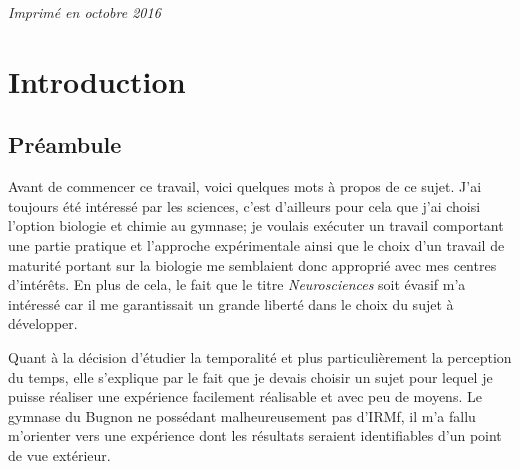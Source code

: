 \documentclass[12pt,fleqn,oneside,openany,]{book} %
\begin{document}
\noindent \textit{Imprimé en octobre 2016} %



\pagestyle{empty} %

\tableofcontents %


\pagestyle{fancy} %



\chapter{Introduction} \label{cha:introduction}
\section{Préambule}
Avant de commencer ce travail, voici quelques mots à propos de ce sujet. J'ai toujours été intéressé par les sciences, c'est d'ailleurs pour cela que j'ai choisi l'option biologie et chimie au gymnase; je voulais exécuter un travail comportant une partie pratique et l'approche expérimentale ainsi que le choix d'un travail de maturité portant sur la biologie me semblaient donc approprié avec mes centres d'intérêts. En plus de cela, le fait que le titre \textit{Neurosciences} soit évasif m'a intéressé car il me garantissait un grande liberté dans le choix du sujet à développer.

Quant à la décision d'étudier la temporalité et plus particulièrement la perception du temps, elle s'explique par le fait que je devais choisir un sujet pour lequel je puisse réaliser une expérience facilement réalisable et avec peu de moyens. Le gymnase du Bugnon ne possédant malheureusement pas d'IRMf, il m'a fallu m'orienter vers une expérience dont les résultats seraient identifiables d'un point de vue extérieur. 
\end{document}
